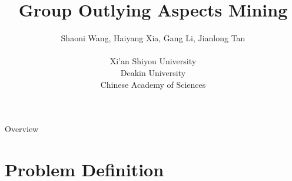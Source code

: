 \documentclass[
 size=14pt,
 paper=smartboard,  %
 mode=present, 		%
 display=slides, 	%
 style=tuliplab,  	%
 pauseslide,
 fleqn,leqno]{powerdot}
\title{Group Outlying Aspects Mining}
\author{
Shaoni Wang, Haiyang Xia, Gang Li, Jianlong Tan
\\
\\Xi'an Shiyou University
\\Deakin University
\\Chinese Academy of Sciences
}
\date{\gitCommitterDate}
\begin{document}
\maketitle



\begin{slide}[toc=,bm=]{Overview}
\tableofcontents[content=currentsection,type=1]
\end{slide}


\section{Problem Definition}
\end{document}

